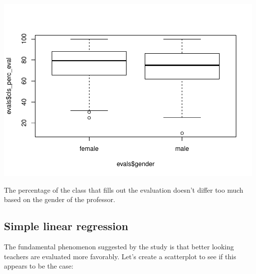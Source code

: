 \documentclass[]{article}
\newenvironment{Shaded}{\begin{snugshade}}{\end{snugshade}}
\newcommand{\KeywordTok}[1]{\textcolor[rgb]{0.13,0.29,0.53}{\textbf{#1}}}
\newcommand{\StringTok}[1]{\textcolor[rgb]{0.31,0.60,0.02}{#1}}
\newcommand{\OperatorTok}[1]{\textcolor[rgb]{0.81,0.36,0.00}{\textbf{#1}}}
\newcommand{\NormalTok}[1]{#1}
\begin{document}
\begin{Shaded}
\end{Shaded}

\includegraphics{multiple_regression_files/figure-latex/quest-3-1.pdf}

The percentage of the class that fills out the evaluation doesn't differ
too much based on the gender of the professor.

\subsection{Simple linear regression}\label{simple-linear-regression}

The fundamental phenomenon suggested by the study is that better looking
teachers are evaluated more favorably. Let's create a scatterplot to see
if this appears to be the case:

\begin{Shaded}
\end{Shaded}
\end{document}
